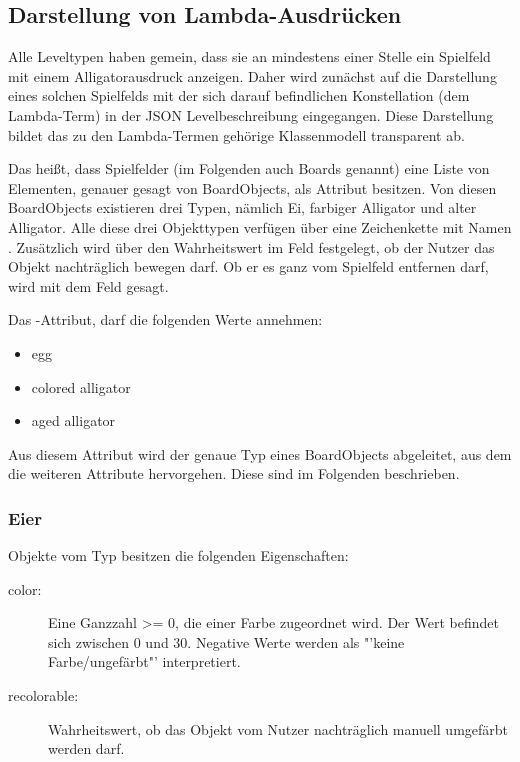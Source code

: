 \subsection{Darstellung von Lambda-Ausdrücken}
Alle Leveltypen haben gemein, dass sie an mindestens einer Stelle ein Spielfeld mit einem Alligatorausdruck anzeigen.
Daher wird zunächst auf die Darstellung eines solchen Spielfelds mit der sich darauf befindlichen Konstellation (dem Lambda-Term) in der JSON Levelbeschreibung eingegangen.
Diese Darstellung bildet das zu den Lambda-Termen gehörige Klassenmodell transparent ab.


Das heißt, dass Spielfelder (im Folgenden auch Boards genannt) eine Liste von Elementen, genauer gesagt von BoardObjects, als Attribut besitzen.
Von diesen BoardObjects existieren drei Typen, nämlich Ei, farbiger Alligator und alter Alligator.
Alle diese drei Objekttypen verfügen über eine Zeichenkette mit Namen .
Zusätzlich wird über den Wahrheitswert im Feld  festgelegt, ob der Nutzer das Objekt nachträglich bewegen darf.
Ob er es ganz vom Spielfeld entfernen darf, wird mit dem Feld  gesagt.

Das -Attribut, darf die folgenden Werte annehmen:
\begin{itemize}
	\item egg
	\item colored alligator
	\item aged alligator
\end{itemize}
Aus diesem Attribut wird der genaue Typ eines BoardObjects abgeleitet, aus dem die weiteren Attribute hervorgehen.
Diese sind im Folgenden beschrieben.

\subsubsection{Eier}
Objekte vom Typ  besitzen die folgenden Eigenschaften:
\begin{description}
	\item[color:] Eine Ganzzahl >= 0, die einer Farbe zugeordnet wird. Der Wert befindet sich zwischen 0 und 30. Negative Werte werden als "'keine Farbe/ungefärbt"' interpretiert.
	\item[recolorable:] Wahrheitswert, ob das Objekt vom Nutzer nachträglich manuell umgefärbt werden darf.
\end{description}

